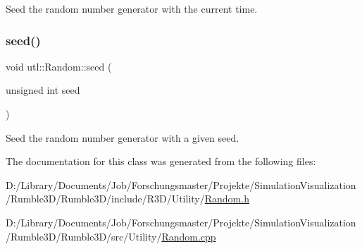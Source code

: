 Seed the random number generator with the current time. \mbox{\label{classutl_1_1_random_ac91fc644c7437c700f2c1addeb65125a}} 
\subsubsection{\texorpdfstring{seed()}{seed()}\hspace{0.1cm}{\footnotesize\ttfamily [2/2]}}
{\footnotesize\ttfamily void utl\+::\+Random\+::seed (\begin{DoxyParamCaption}\item[{unsigned int}]{seed }\end{DoxyParamCaption})\hspace{0.3cm}{\ttfamily [static]}}

Seed the random number generator with a given seed. 

The documentation for this class was generated from the following files\+:\begin{DoxyCompactItemize}
\item 
D\+:/\+Library/\+Documents/\+Job/\+Forschungsmaster/\+Projekte/\+Simulation\+Visualization/\+Rumble3\+D/\+Rumble3\+D/include/\+R3\+D/\+Utility/\mbox{\hyperlink{_random_8h}{Random.\+h}}\item 
D\+:/\+Library/\+Documents/\+Job/\+Forschungsmaster/\+Projekte/\+Simulation\+Visualization/\+Rumble3\+D/\+Rumble3\+D/src/\+Utility/\mbox{\hyperlink{_random_8cpp}{Random.\+cpp}}\end{DoxyCompactItemize}
